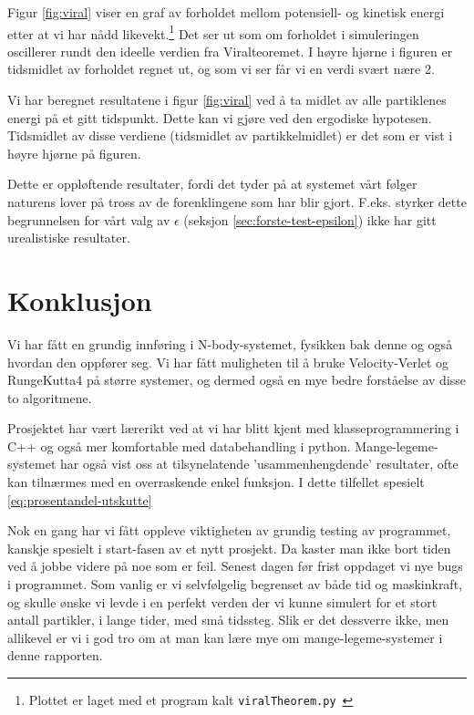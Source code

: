 \documentclass[11pt]{article}
\begin{document}
\begin{multicols*}{2}

Figur \ref{fig:viral} viser en graf av forholdet mellom potensiell- og
kinetisk energi etter at vi har nådd likevekt.\footnote{Plottet er
  laget med et program kalt
  \texttt{viralTheorem.py}~\cite{github-repo}} Det ser ut som om
forholdet i simuleringen oscillerer rundt den ideelle verdien fra
Viralteoremet. I høyre hjørne i figuren er tidsmidlet av forholdet
regnet ut, og som vi ser får vi en verdi svært nære 2. 

Vi har beregnet resultatene i figur \ref{fig:viral} ved å ta midlet av
alle partiklenes energi på et gitt tidspunkt. Dette kan vi gjøre ved
den ergodiske hypotesen. Tidsmidlet av disse
verdiene (tidsmidlet av partikkelmidlet) er det som er vist i høyre
hjørne på figuren.

Dette er oppløftende resultater, fordi det tyder på at systemet vårt følger
naturens lover på tross av de forenklingene som har blir
gjort. F.eks. styrker dette begrunnelsen for vårt valg av $\epsilon$
(seksjon \ref{sec:forste-test-epsilon}) ikke har gitt urealistiske
resultater. 


\section{Konklusjon}
Vi har fått en grundig innføring i N-body-systemet, fysikken bak denne
og også hvordan den oppfører seg. Vi har fått muligheten til å
bruke Velocity-Verlet og RungeKutta4 på større systemer, og dermed
også en mye bedre forståelse av disse to algoritmene.

Prosjektet har vært lærerikt ved at vi har blitt kjent med
klasseprogrammering i C++ og også mer komfortable med databehandling
i python. Mange-legeme-systemet har også vist oss at
tilsynelatende 'usammenhengdende' resultater, ofte kan tilnærmes
med en overraskende enkel funksjon. I dette tilfellet spesielt
\ref{eq:prosentandel-utskutte}

Nok en gang har vi fått oppleve viktigheten av grundig testing
av programmet, kanskje spesielt i start-fasen av et nytt prosjekt. Da 
kaster man ikke bort tiden ved å jobbe videre på noe som er feil. Senest
dagen før frist oppdaget vi nye bugs i programmet. Som vanlig er vi
selvfølgelig begrenset av både tid og maskinkraft, og skulle ønske vi 
levde i en perfekt verden der vi kunne simulert for et stort antall partikler,
i lange tider, med små tidssteg. Slik er det dessverre ikke, 
men allikevel er vi i god tro om at man kan lære mye om mange-legeme-systemer
i denne rapporten.







\end{multicols*}
\clearpage
\printbibliography
\clearpage
\end{document}
